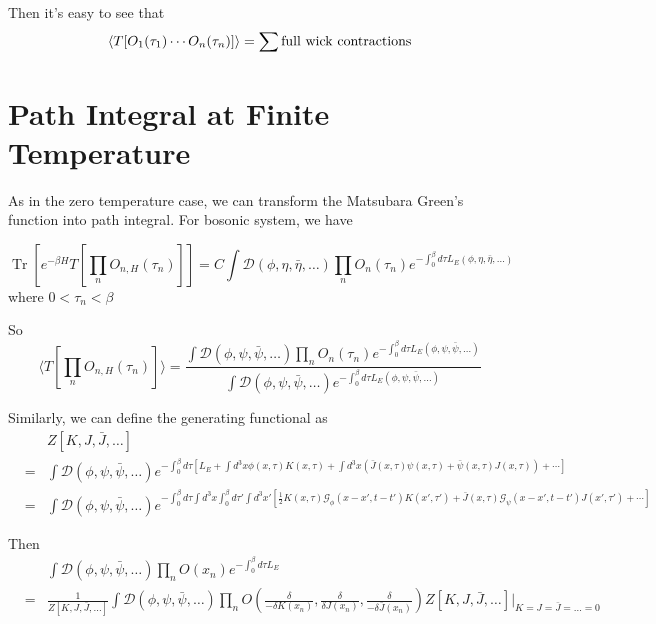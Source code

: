 \documentclass[12pt]{book}
\DeclareMathOperator{\Tr}{Tr}
\begin{document}
	Then it's easy to see that
	\begin{equation}
		\langle T[O_1(\tau_1)\cdots O_n(\tau_n)]\rangle=\sum{\rm full\ wick\ contractions}
	\end{equation}


	
	\section{Path Integral at Finite Temperature}
	
	As in the zero temperature case, we can transform the Matsubara Green's function into path integral. For bosonic system, we have
	
	\begin{equation}
		\Tr[e^{-\beta H}T[\prod_nO_{n,H}(\tau_n)]]=C\int \mathcal D(\phi,\eta,\bar\eta,\dots)\prod_n O_n(\tau_n)e^{-\int_0^\beta d\tau L_E(\phi,\eta,\bar\eta,\dots)}
	\end{equation}
	where $0<\tau_n<\beta$
	
	So
	\begin{equation}
		\langle T[\prod_nO_{n,H}(\tau_n)]\rangle=\frac{\int \mathcal D(\phi,\psi,\bar\psi,\dots)\prod_n O_n(\tau_n)e^{-\int_0^\beta d\tau L_E(\phi,\psi,\bar\psi,\dots)}}{\int \mathcal D(\phi,\psi,\bar\psi,\dots)e^{-\int_0^\beta d\tau L_E(\phi,\psi,\bar\psi,\dots)}}
	\end{equation}
	
	Similarly, we can define the generating functional as
	\begin{eqnarray}
		&&Z[K,J,\bar J,\dots]\\
		&=&\int \mathcal D (\phi,\psi,\bar\psi,\dots) e^{-\int_0^\beta d\tau[L_E+\int d^3x\phi(x,\tau)K(x,\tau)+\int d^3x(\bar J(x,\tau)\psi(x,\tau)+\bar \psi(x,\tau)J(x,\tau))+\cdots]}\\
		&=&\int \mathcal D (\phi,\psi,\bar\psi,\dots) e^{-\int_0^\beta d\tau\int d^3x\int_0^\beta d\tau'\int d^3x'[\frac 12K(x,\tau)\mathcal G_\phi(x-x',t-t')K(x',\tau')+\bar J(x,\tau)\mathcal G_\psi(x-x',t-t')J(x',\tau')+\cdots]}
	\end{eqnarray}
	
	Then
	\begin{eqnarray}
		&&\int \mathcal D (\phi,\psi,\bar\psi,\dots)\prod_n O(x_n)e^{-\int_0^\beta d\tau L_E}\\
		&=&\frac 1{Z[K,J,\bar J,\dots]}\int \mathcal D (\phi,\psi,\bar\psi,\dots)\prod_n O(\frac{\delta}{-\delta K(x_n)},\frac{\delta}{\delta J(x_n)},\frac{\delta}{-\delta \bar J(x_n)})Z[K,J,\bar J,\dots]|_{K=J=\bar J=\dots=0}
	\end{eqnarray}
	
\end{document}
